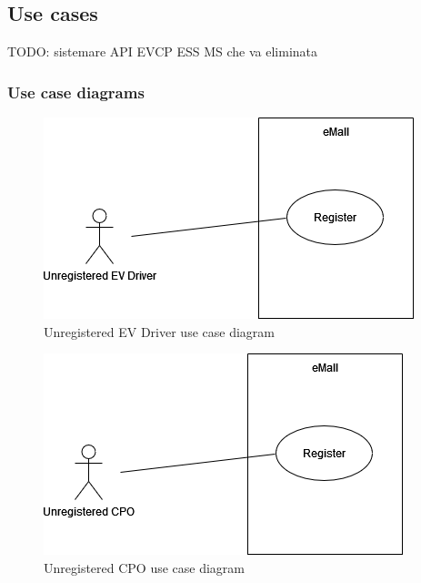 \subsection{Use cases}
TODO: sistemare API EVCP ESS MS che va eliminata
\subsubsection{Use case diagrams}

\vspace*{3cm}
\begin{figure}[H]
    \centering
    \includegraphics[scale=0.6]{src/use_case_diagram/driver_registration.png}
    \caption{Unregistered EV Driver use case diagram}
\end{figure}
\vspace*{3cm}
\begin{figure}[H]
    \centering
    \includegraphics[scale=0.6]{src/use_case_diagram/cpo_registration.png}
    \caption{Unregistered CPO use case diagram}
\end{figure}

